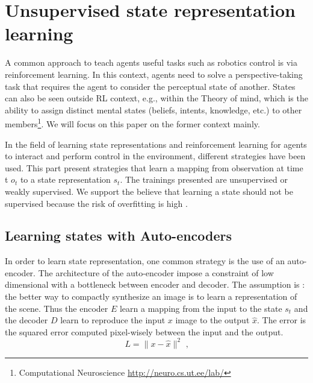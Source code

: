 \documentclass[a4paper]{article}
\newcommand{\natalia}[1]{\todo[color=green!60,inline]{#1}}
\begin{document}

\section{Unsupervised state representation learning}
\label{Sec:UnsupervisedMethods}

  A common approach to teach agents useful tasks such as robotics control is via reinforcement learning.  In this context, agents need to solve a perspective-taking task that requires the agent to consider the perceptual state of another. States can also be seen outside RL context, e.g., within the Theory of mind, which is the ability to assign distinct mental states (beliefs, intents, knowledge, etc.) to other members\footnote{Computational Neuroscience \url{http://neuro.cs.ut.ee/lab/}}. We will focus on this paper on the former context mainly.

In the field of learning state representations and reinforcement learning for agents to interact and perform control in the environment, different strategies have been used. This part present strategies that learn a mapping from observation at time t $o_t$ to a state representation $s_t$. The trainings presented are unsupervised or weakly supervised. We support the believe that learning a state should not be supervised because the risk of overfitting is high \cite{Bengio12}. 

\subsection{Learning states with Auto-encoders }
In order to learn state representation, one common strategy is the use of an auto-encoder. The architecture of the auto-encoder impose a constraint of low dimensional with a bottleneck between encoder and decoder. The assumption is : the better way to compactly synthesize an image is to learn a representation of the scene. Thus the encoder $E$ learn a mapping from the input to the state $s_t$ and the decoder $D$ learn to reproduce the input $x$ image to the output $\hat{x}$. The error is the squared error computed pixel-wisely between the input and the output.
\begin{equation}
L = \parallel x - \hat{x} \parallel^2 \mbox{ ,}
\label{equation_Squared_error}
\end{equation}
\natalia{why this comma?}
\end{document}
